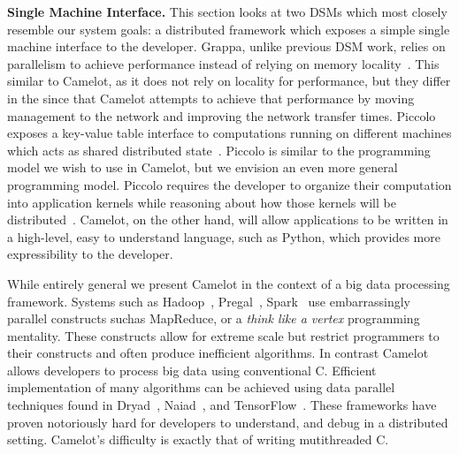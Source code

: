 \textbf{Single Machine Interface.} This section looks at two DSMs which most
closely resemble our system goals: a distributed framework which exposes a
simple single machine interface to the developer. Grappa, unlike previous DSM
work, relies on parallelism to achieve performance instead of relying on memory
locality~\cite{Nelson2015}. This similar to Camelot, as it does not rely on
locality for performance, but they differ in the since that Camelot attempts to
achieve that performance by moving management to the network and improving the
network transfer times. Piccolo exposes a key-value table interface to
computations running on different machines which acts as shared distributed
state~\cite{piccolo}. Piccolo is similar to the programming model we wish to use
in Camelot, but we envision an even more general programming model. Piccolo
requires the developer to organize their computation into application kernels
while reasoning about how those kernels will be distributed~\cite{piccolo}.
Camelot, on the other hand, will allow applications to be written in a
high-level, easy to understand language, such as Python, which provides more
expressibility to the developer.	

While entirely general we present Camelot in the context of a big data
processing framework. Systems such as Hadoop~\cite{Dean2004}, Pregal~\cite{Malewicz:2010:PSL:1807167.1807184}, 
Spark~\cite{180560} use embarrassingly parallel constructs suchas MapReduce, or
a \textit{think like a vertex} programming mentality. These constructs allow for
extreme scale but restrict programmers to their constructs and often produce
inefficient algorithms. In contrast Camelot allows developers to process big
data using conventional C. Efficient implementation of many algorithms can be
achieved using data parallel techniques found in Dryad~\cite{Isard:2007:DDD:1272996.1273005},
Naiad~\cite{Murray2013}, and TensorFlow~\cite{tensorflow2015-whitepaper}. These
frameworks have proven notoriously hard for developers to understand, and debug
in a distributed setting. Camelot's difficulty is exactly that of writing
mutithreaded C.
